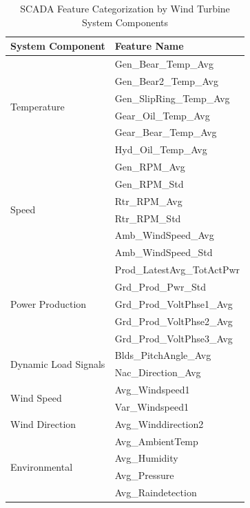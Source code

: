 \documentclass[12pt]{article}
\begin{document}
\begin{table}[htbp]
\centering
\caption{SCADA Feature Categorization by Wind Turbine System Components}
\vspace{0.2cm}
\label{tab:feature_categorization}
\renewcommand{\arraystretch}{1.2}
\begin{tabular}{ll}
\toprule
\textbf{System Component} & \textbf{Feature Name} \\
\midrule
\multirow{6}{*}{Temperature} 
  & Gen\_Bear\_Temp\_Avg \\
  & Gen\_Bear2\_Temp\_Avg \\
  & Gen\_SlipRing\_Temp\_Avg \\
  & Gear\_Oil\_Temp\_Avg \\
  & Gear\_Bear\_Temp\_Avg \\
  & Hyd\_Oil\_Temp\_Avg \\
\midrule
\multirow{6}{*}{Speed} 
  & Gen\_RPM\_Avg \\
  & Gen\_RPM\_Std \\
  & Rtr\_RPM\_Avg \\
  & Rtr\_RPM\_Std \\
  & Amb\_WindSpeed\_Avg \\
  & Amb\_WindSpeed\_Std \\
\midrule
\multirow{5}{*}{Power Production} 
  & Prod\_LatestAvg\_TotActPwr \\
  & Grd\_Prod\_Pwr\_Std \\
  & Grd\_Prod\_VoltPhse1\_Avg \\
  & Grd\_Prod\_VoltPhse2\_Avg \\
  & Grd\_Prod\_VoltPhse3\_Avg \\
\midrule
\multirow{2}{*}{Dynamic Load Signals} 
  & Blds\_PitchAngle\_Avg \\
  & Nac\_Direction\_Avg \\
\midrule
\multirow{2}{*}{Wind Speed}
  & Avg\_Windspeed1 \\
  & Var\_Windspeed1 \\
\midrule
Wind Direction & Avg\_Winddirection2 \\
\midrule
\multirow{4}{*}{Environmental}
  & Avg\_AmbientTemp \\
  & Avg\_Humidity \\
  & Avg\_Pressure \\
  & Avg\_Raindetection \\
\bottomrule
\end{tabular}
\end{table}

\end{document}
